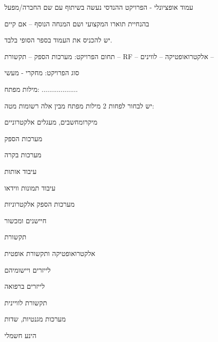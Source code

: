 \documentclass[12pt]{book}
\numberwithin{equation}{section}
\numberwithin{figure}{section}
\numberwithin{table}{section}
\begin{document}
\begin{hebrew}
\fontsize{12pt}{15pt}
\selectfont

עמוד אופציונלי -  הפרויקט ההנדסי נעשה בשיתוף עם שם החברה/מפעל

בהנחיית תוארו המקצועי ושם המנחה הנוסף – אם קיים

\newpage


יש להכניס את העמוד בספר הסופי בלבד.

\vspace*{1cm}

תחום הפרויקט:   מערכות הספק – תקשורת – RF – אלקטרואופטיקה – לווינים –

\vspace*{1cm}

 סוג הפרויקט:   מחקרי - מעשי

 \vspace*{1cm}


\vspace*{1cm}

מילות מפתח: ...................

\vspace*{1cm}

יש לבחור לפחות 2 מילות מפתח מבין אלה רשומות מטה:

מיקרומחשבים, מעגלים אלקטרוניים 

מערכות הספק 

מערכות בקרה 


עיבוד אותות 

עיבוד תמונות ווידאו 

מערכות הספק אלקטרוניות 

חיישנים ומכשור 

תקשורת 

אלקטרואופטיקה ותקשורת אופטית 

לייזרים ויישומיהם 

לייזרים ברפואה 

תקשורת לוויינית 

מערכות מגנטיות, שדות 

הינע חשמלי 


\end{hebrew}
\end{document}
